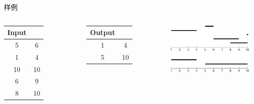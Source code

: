 \begin{frame}{样例}
    \begin{columns}
            \begin{table}
                \begin{tabular}{cc}
                Input \\\hline
                5  & 6 \\\hline
				1  & 4  \\\hline
				10 & 10 \\\hline
				6  & 9  \\\hline
				8  & 10  \\\hline
                \end{tabular}
            \end{table}
            \begin{table}
                \begin{tabular}{cc}
                Output \\\hline
				1  & 4  \\\hline
				5 & 10 \\\hline
                \end{tabular}
            \end{table}
        \includegraphics[scale=.8]{fig/5-2.pdf}
    \end{columns}
\end{frame}
